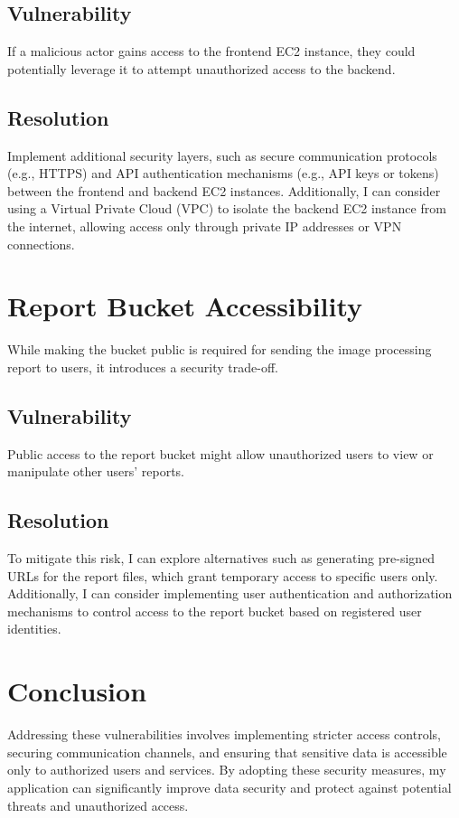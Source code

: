 \subsection{Vulnerability}
If a malicious actor gains access to the frontend EC2 instance, they could potentially leverage it to attempt unauthorized access to the backend.

\subsection{Resolution}
Implement additional security layers, such as secure communication protocols (e.g., HTTPS) and API authentication mechanisms (e.g., API keys or tokens) between the frontend and backend EC2 instances. Additionally, I can consider using a Virtual Private Cloud (VPC) to isolate the backend EC2 instance from the internet, allowing access only through private IP addresses or VPN connections.

\section{Report Bucket Accessibility}
While making the bucket public is required for sending the image processing report to users, it introduces a security trade-off.

\subsection{Vulnerability}
Public access to the report bucket might allow unauthorized users to view or manipulate other users' reports.

\subsection{Resolution}
To mitigate this risk, I can explore alternatives such as generating pre-signed URLs for the report files, which grant temporary access to specific users only. Additionally, I can consider implementing user authentication and authorization mechanisms to control access to the report bucket based on registered user identities.

\section{Conclusion}
Addressing these vulnerabilities involves implementing stricter access controls, securing communication channels, and ensuring that sensitive data is accessible only to authorized users and services. By adopting these security measures, my application can significantly improve data security and protect against potential threats and unauthorized access.
\newpage

